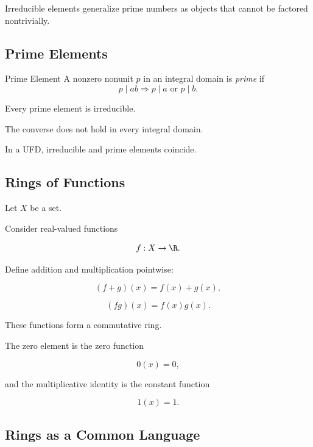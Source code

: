 Irreducible elements generalize prime numbers as objects that cannot be
factored nontrivially.

\subsection{Prime Elements}
\label{subsec:prime-elements}

\begin{definitionbox}{Prime Element}
A nonzero nonunit \(p\) in an integral domain is \emph{prime} if
\[ p\mid ab\Longrightarrow p\mid a\text{ or }p\mid b. \]
\end{definitionbox}

Every prime element is irreducible.

The converse does not hold in every integral domain.

In a UFD, irreducible and prime elements coincide.

\subsection{Rings of Functions}
\label{subsec:rings-of-functions}

Let \(X\) be a set.

Consider real-valued functions

\[ f:X\to\R. \]

Define addition and multiplication pointwise:

\[ (f+g)(x)=f(x)+g(x), \]

\[ (fg)(x)=f(x)g(x). \]

These functions form a commutative ring.

The zero element is the zero function

\[ 0(x)=0, \]

and the multiplicative identity is the constant function

\[ 1(x)=1. \]

\subsection{Rings as a Common Language}
\label{subsec:rings-common-language}

